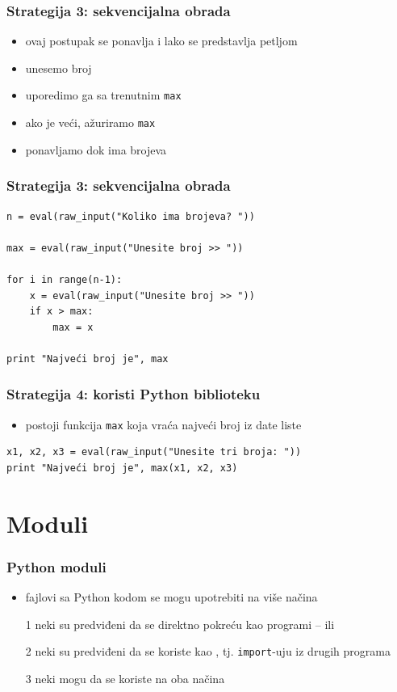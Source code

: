 \documentclass[utf8,compress]{beamer}
\begin{document}
\begin{frame}[fragile]
  \frametitle{Strategija 3: sekvencijalna obrada}
  \begin{itemize}
    \item ovaj postupak se ponavlja i lako se predstavlja petljom
    \item unesemo broj
    \item uporedimo ga sa trenutnim \texttt{max}
    \item ako je veći, ažuriramo \texttt{max}
    \item ponavljamo dok ima brojeva
  \end{itemize}
\end{frame}

\begin{frame}[fragile]
  \frametitle{Strategija 3: sekvencijalna obrada}
\begin{verbatim}
n = eval(raw_input("Koliko ima brojeva? "))

max = eval(raw_input("Unesite broj >> "))

for i in range(n-1): 
    x = eval(raw_input("Unesite broj >> "))
    if x > max:
        max = x

print "Najveći broj je", max
\end{verbatim}
\end{frame}

\begin{frame}[fragile]
  \frametitle{Strategija 4: koristi Python biblioteku}
  \begin{itemize}
    \item postoji funkcija \texttt{max} koja vraća najveći broj iz date liste
  \end{itemize}
\begin{verbatim}
x1, x2, x3 = eval(raw_input("Unesite tri broja: "))
print "Najveći broj je", max(x1, x2, x3)
\end{verbatim}
\end{frame}

\section{Moduli}

\begin{frame}[fragile]
  \frametitle{Python moduli}
  \begin{itemize}
    \item fajlovi sa Python kodom se mogu upotrebiti na više načina
    \item[1] neki su predviđeni da se direktno pokreću kao programi --  ili 
    \item[2] neki su predviđeni da se koriste kao , tj. \texttt{import}-uju iz drugih programa
    \item[3] neki mogu da se koriste na oba načina
  \end{itemize}
\end{frame}
\end{document}
